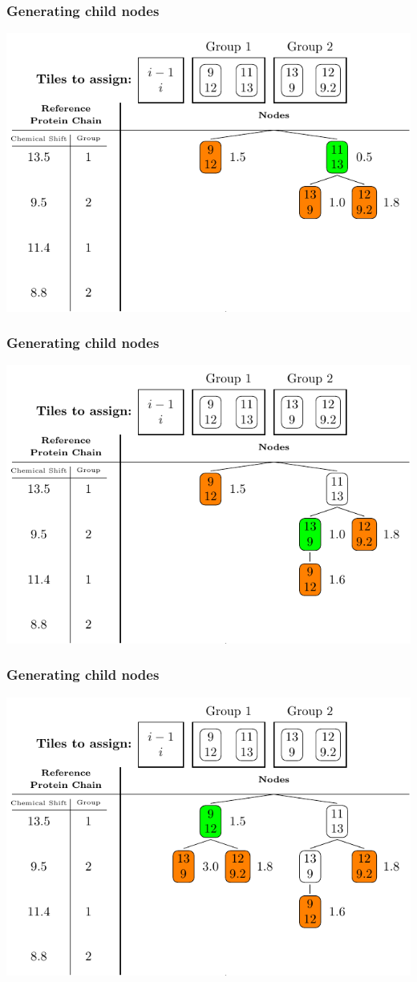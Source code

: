 \documentclass{beamer}
\begin{document}
\begin{frame}
	\frametitle{Generating child nodes}
	\vspace{-.5cm}
	\center
	\includegraphics[width=.9\textwidth]{tilePlacement/step4}
\end{frame}

\begin{frame}
	\frametitle{Generating child nodes} 
	\vspace{-.5cm}
	\center
	\includegraphics[width=.9\textwidth]{tilePlacement/step5}
\end{frame}

\begin{frame}
	\frametitle{Generating child nodes} 
	\vspace{-.5cm} 
	\center
	\includegraphics[width=.9\textwidth]{tilePlacement/step6}
\end{frame}
\end{document}
